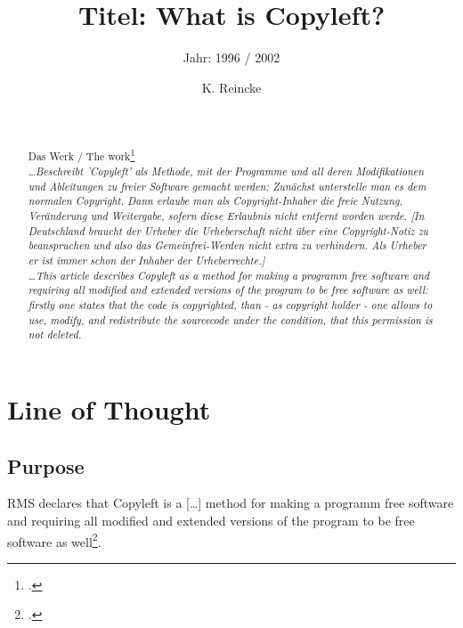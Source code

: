 \documentclass[DIV=calc,BCOR=5mm,11pt,headings=small,oneside,abstract=true, toc=bib]{scrartcl}
\begin{document}

\titlehead{Literaturexzerpt}
\subject{Autor(en): Stallman / Stallman1996c }
\title{Titel: What is Copyleft?}
\subtitle{Jahr: 1996 / 2002 }
\author{K. Reincke}

\maketitle

\begin{abstract}
\noindent
\cite[(in:)][]{StaGay2002a} \\
\noindent
\cite[(ist:)][]{Stallman1996c} \\
Das Werk / The work\footcite[][]{Stallman1996c} \\
\noindent \itshape
\ldots  Beschreibt 'Copyleft' als Methode, mit der Programme und all deren
Modifikationen und Ableitungen zu freier Software gemacht werden: Zunächst
unterstelle man es dem normalen Copyright. Dann erlaube man als
Copyright-Inhaber die freie Nutzung, Veränderung und Weitergabe, sofern diese
Erlaubnis nicht entfernt worden werde. [In Deutschland braucht der Urheber die
Urheberschaft nicht über eine Copyright-Notiz zu beanspruchen und also das
Gemeinfrei-Werden nicht extra zu verhindern. Als Urheber er ist immer schon der
Inhaber der Urheberrechte.]
\\
\noindent
\ldots This article describes Copyleft as a method for making a programm free
software and requiring all modified and extended versions of the program to be
free software as well: firstly one states that the code is copyrighted, than -
as copyright holder - one allows to use, modify, and redistribute the sourcecode
under the condition, that this permission is not deleted.
\end{abstract}
\footnotesize
\normalsize

\section{Line of Thought}

\subsection{Purpose}
RMS declares that \glqq{}Copyleft is a [\ldots] method for making a programm
free software and requiring all modified and extended versions of the program to
be free software as well\grqq{}\footcite[cf][89]{Stallman1996c}.
\end{document}
